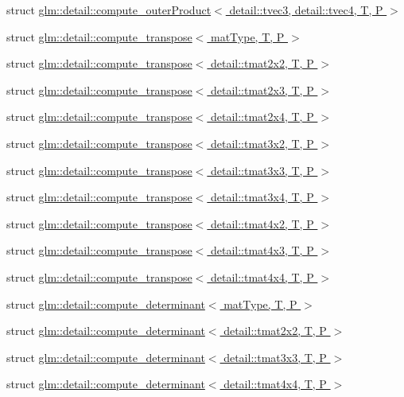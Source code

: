 \begin{DoxyCompactItemize}
struct \hyperlink{structglm_1_1detail_1_1compute__outer_product_3_01detail_1_1tvec3_00_01detail_1_1tvec4_00_01_t_00_01_p_01_4}{glm\+::detail\+::compute\+\_\+outer\+Product$<$ detail\+::tvec3, detail\+::tvec4, T, P $>$}
\item 
struct \hyperlink{structglm_1_1detail_1_1compute__transpose}{glm\+::detail\+::compute\+\_\+transpose$<$ mat\+Type, T, P $>$}
\item 
struct \hyperlink{structglm_1_1detail_1_1compute__transpose_3_01detail_1_1tmat2x2_00_01_t_00_01_p_01_4}{glm\+::detail\+::compute\+\_\+transpose$<$ detail\+::tmat2x2, T, P $>$}
\item 
struct \hyperlink{structglm_1_1detail_1_1compute__transpose_3_01detail_1_1tmat2x3_00_01_t_00_01_p_01_4}{glm\+::detail\+::compute\+\_\+transpose$<$ detail\+::tmat2x3, T, P $>$}
\item 
struct \hyperlink{structglm_1_1detail_1_1compute__transpose_3_01detail_1_1tmat2x4_00_01_t_00_01_p_01_4}{glm\+::detail\+::compute\+\_\+transpose$<$ detail\+::tmat2x4, T, P $>$}
\item 
struct \hyperlink{structglm_1_1detail_1_1compute__transpose_3_01detail_1_1tmat3x2_00_01_t_00_01_p_01_4}{glm\+::detail\+::compute\+\_\+transpose$<$ detail\+::tmat3x2, T, P $>$}
\item 
struct \hyperlink{structglm_1_1detail_1_1compute__transpose_3_01detail_1_1tmat3x3_00_01_t_00_01_p_01_4}{glm\+::detail\+::compute\+\_\+transpose$<$ detail\+::tmat3x3, T, P $>$}
\item 
struct \hyperlink{structglm_1_1detail_1_1compute__transpose_3_01detail_1_1tmat3x4_00_01_t_00_01_p_01_4}{glm\+::detail\+::compute\+\_\+transpose$<$ detail\+::tmat3x4, T, P $>$}
\item 
struct \hyperlink{structglm_1_1detail_1_1compute__transpose_3_01detail_1_1tmat4x2_00_01_t_00_01_p_01_4}{glm\+::detail\+::compute\+\_\+transpose$<$ detail\+::tmat4x2, T, P $>$}
\item 
struct \hyperlink{structglm_1_1detail_1_1compute__transpose_3_01detail_1_1tmat4x3_00_01_t_00_01_p_01_4}{glm\+::detail\+::compute\+\_\+transpose$<$ detail\+::tmat4x3, T, P $>$}
\item 
struct \hyperlink{structglm_1_1detail_1_1compute__transpose_3_01detail_1_1tmat4x4_00_01_t_00_01_p_01_4}{glm\+::detail\+::compute\+\_\+transpose$<$ detail\+::tmat4x4, T, P $>$}
\item 
struct \hyperlink{structglm_1_1detail_1_1compute__determinant}{glm\+::detail\+::compute\+\_\+determinant$<$ mat\+Type, T, P $>$}
\item 
struct \hyperlink{structglm_1_1detail_1_1compute__determinant_3_01detail_1_1tmat2x2_00_01_t_00_01_p_01_4}{glm\+::detail\+::compute\+\_\+determinant$<$ detail\+::tmat2x2, T, P $>$}
\item 
struct \hyperlink{structglm_1_1detail_1_1compute__determinant_3_01detail_1_1tmat3x3_00_01_t_00_01_p_01_4}{glm\+::detail\+::compute\+\_\+determinant$<$ detail\+::tmat3x3, T, P $>$}
\item 
struct \hyperlink{structglm_1_1detail_1_1compute__determinant_3_01detail_1_1tmat4x4_00_01_t_00_01_p_01_4}{glm\+::detail\+::compute\+\_\+determinant$<$ detail\+::tmat4x4, T, P $>$}
\end{DoxyCompactItemize}
